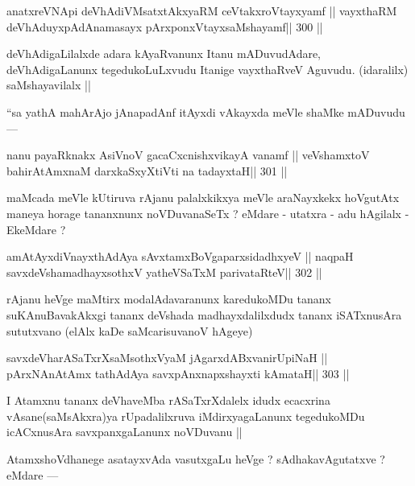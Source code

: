\begin{shl}
anatxreVNApi deVhAdiVMsatxtAkxyaRM ceVtakxroVtayxyamf ||
vayxthaRM deVhAduyxpAdAnamasayx pArxponxVtayxsaMshayamf\hfill || 300 ||
\end{shl}

\begin{artha}
deVhAdigaLilalxde adara kAyaRvanunx Itanu mADuvudAdare, deVhAdigaLanunx tegedukoLuLxvudu Itanige vayxthaRveV Aguvudu. (idaralilx) saMshayavilalx ||
\end{artha}

\begin{artha}
``sa yathA mahArAjo jAnapadAnf itAyxdi vAkayxda meVle shaMke mADuvudu ---
\end{artha}

\begin{shl}
nanu payaRknakx AsiVnoV gacaCxcnishxvikayA vanamf ||
veVshamxtoV bahirAtAmxnaM darxkaSxyXtiVti na tadayxtaH\hfill || 301 ||
\end{shl}

\begin{artha}
maMcada meVle kUtiruva rAjanu palalxkikxya meVle araNayxkekx hoVgutAtx maneya horage tananxnunx noVDuvanaSeTx ? eMdare - utatxra - adu hAgilalx - EkeMdare ?
\end{artha}

\begin{shl}
amAtAyxdiVnayxthA\s\s dAya sAvxtamxBoVgaparxsidadhxyeV ||
naqpaH savxdeVshamadhayxsothxV yatheVSaTxM parivataRteV\hfill || 302 ||
\end{shl}

\begin{artha}
rAjanu heVge maMtirx modalAdavaranunx karedukoMDu tananx suKAnuBavakAkxgi tananx deVshada madhayxdalilxdudx tananx iSATxnusAra sututxvano (elAlx kaDe saMcarisuvanoV hAgeye)
\end{artha}

\begin{shl}
savxdeVharASaTxrXsaMsothxV\s yaM jAgarxdABxvanirUpiNaH ||
pArxNAnAtAmx tathA\s\s dAya savxpAnxnapxshayxti kAmataH\hfill || 303 ||
\end{shl}

\begin{artha}
I Atamxnu tananx deVhaveMba rASaTxrXdalelx idudx ecacxrina vAsane(saMsAkxra)ya rUpadalilxruva iMdirxyagaLanunx tegedukoMDu icACxnusAra savxpanxgaLanunx noVDuvanu ||
\end{artha}

\begin{artha}
AtamxshoVdhanege asatayxvAda vasutxgaLu heVge ? sAdhakavAgutatxve ? eMdare ---
\end{artha}

